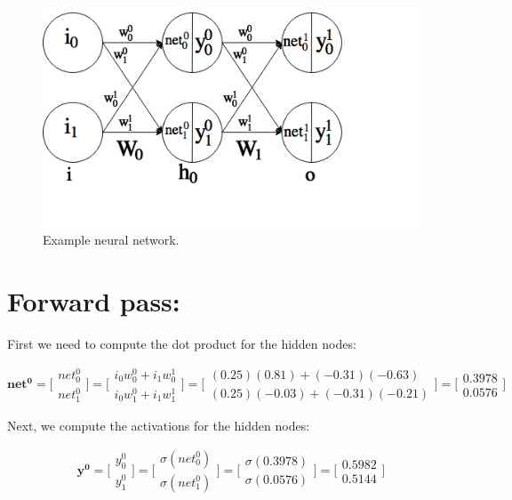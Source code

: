 \documentclass{article}
\begin{document}
\begin{figure}[h!]
\centering
\hspace{3cm} 
\includegraphics[scale=0.7]{figs/bp_ex.png}
\caption{Example neural network.}
\label{fig:bp_ex}
\end{figure}

\section*{Forward pass:}

First we need to compute the dot product for the hidden nodes:

\begin{equation}
    \mathbf{net^0} = \bigg[\begin{matrix} net_0^0 \\ net_1^0 \end{matrix}\bigg] =
    \bigg[\begin{matrix} i_0 w_0^0 + i_1 w_0^1 \\ i_0 w_1^0 + i_1 w_1^1 \end{matrix}\bigg] = 
    \bigg[\begin{matrix} (0.25)(0.81) + (-0.31)(-0.63) \\ (0.25)(-0.03) + (-0.31)(-0.21) \end{matrix}\bigg] =
    \bigg[\begin{matrix} 0.3978 \\ 0.0576 \end{matrix}\bigg]
\end{equation}

Next, we compute the activations for the hidden nodes:

\begin{equation}
    \mathbf{y^0} =
    \bigg[\begin{matrix} y_0^0 \\ y_1^0 \end{matrix}\bigg] = \bigg[\begin{matrix} \sigma(net_0^0) \\ \sigma(net_1^0) \end{matrix}\bigg] = 
    \bigg[\begin{matrix} \sigma(0.3978) \\ \sigma(0.0576) \end{matrix}\bigg] =
    \bigg[\begin{matrix} 0.5982 \\ 0.5144 \end{matrix}\bigg]
\end{equation}
\end{document}
